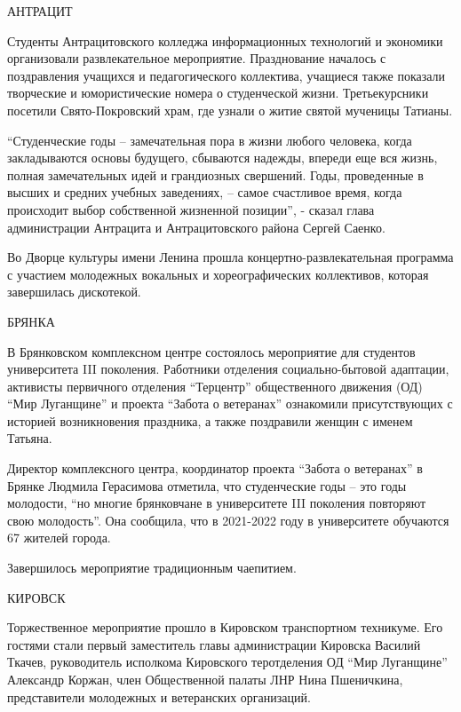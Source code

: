АНТРАЦИТ

Студенты Антрацитовского колледжа информационных технологий и экономики
организовали развлекательное мероприятие. Празднование началось с поздравления
учащихся и педагогического коллектива, учащиеся также показали творческие и
юмористические номера о студенческой жизни. Третьекурсники посетили
Свято-Покровский храм, где узнали о житие святой мученицы Татианы.


\enquote{Студенческие годы – замечательная пора в жизни любого человека, когда
закладываются основы будущего, сбываются надежды, впереди еще вся жизнь, полная
замечательных идей и грандиозных свершений. Годы, проведенные в высших и
средних учебных заведениях, – самое счастливое время, когда происходит выбор
собственной жизненной позиции}, - сказал глава администрации Антрацита и
Антрацитовского района Сергей Саенко.

Во Дворце культуры имени Ленина прошла концертно-развлекательная программа с
участием молодежных вокальных и хореографических коллективов, которая
завершилась дискотекой.

БРЯНКА

В Брянковском комплексном центре состоялось мероприятие для студентов
университета III поколения. Работники отделения социально-бытовой адаптации,
активисты первичного отделения \enquote{Терцентр} общественного движения (ОД) \enquote{Мир
Луганщине} и проекта \enquote{Забота о ветеранах} ознакомили присутствующих с историей
возникновения праздника, а также поздравили женщин с именем Татьяна.


Директор комплексного центра, координатор проекта \enquote{Забота о ветеранах} в Брянке
Людмила Герасимова отметила, что студенческие годы – это годы молодости, \enquote{но
многие брянковчане в университете III поколения повторяют свою молодость}. Она
сообщила, что в 2021-2022 году в университете обучаются 67 жителей города.


Завершилось мероприятие традиционным чаепитием.

КИРОВСК

Торжественное мероприятие прошло в Кировском транспортном техникуме. Его
гостями стали первый заместитель главы администрации Кировска Василий Ткачев,
руководитель исполкома Кировского теротделения ОД \enquote{Мир Луганщине} Александр
Коржан, член Общественной палаты ЛНР Нина Пшеничкина, представители молодежных
и ветеранских организаций.

